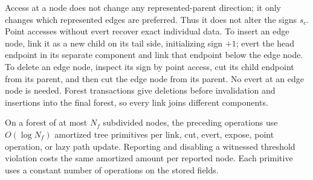 Access at a node does not change any represented-parent direction; it
only changes which represented edges are preferred.  Thus it does not
alter the signs $s_c$.  Point accesses without evert recover exact
individual data.  To insert an edge node, link it as a new child on its
tail side, initializing sign $+1$; evert the head endpoint in its
separate component and link that endpoint below the edge node.  To
delete an edge node, inspect its sign by point access, cut its child
endpoint from its parent, and then cut the edge node from its parent.
No evert at an edge node is needed.  Forest transactions give deletions
before invalidation and insertions into the final forest, so every link
joins different components.

\begin{lemma}\label{engine:tree-cost}
On a forest of at most $N_f$ subdivided nodes, the preceding operations
use $O(\log N_f)$ amortized tree primitives per link, cut, evert, expose,
point operation, or lazy path update.  Reporting and disabling a
witnessed threshold violation costs the same amortized amount per
reported node.  Each primitive uses a constant number of operations on
the stored fields.
\end{lemma}

